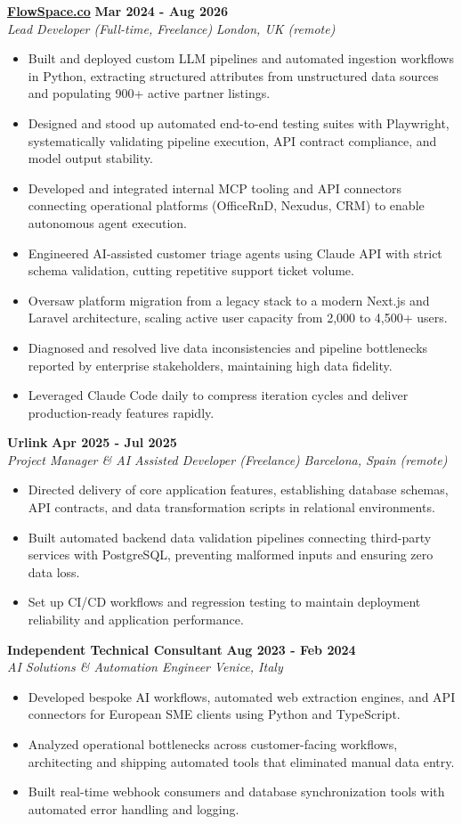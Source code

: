 \documentclass[10pt,a4paper]{article}
\newcommand{\role}[4]{%
  \textbf{#1} \hfill \textbf{#2}\\[1pt]%
  \textit{#3} \hfill \textit{#4}\\[2pt]%
}
\begin{document}
\role{\href{https://flowspace.co}{FlowSpace.co}}{Mar 2024 - Aug 2026}{Lead Developer (Full-time, Freelance)}{London, UK (remote)}
\begin{itemize}
  \item Built and deployed custom LLM pipelines and automated ingestion workflows in Python, extracting structured attributes from unstructured data sources and populating 900+ active partner listings.
  \item Designed and stood up automated end-to-end testing suites with Playwright, systematically validating pipeline execution, API contract compliance, and model output stability.
  \item Developed and integrated internal MCP tooling and API connectors connecting operational platforms (OfficeRnD, Nexudus, CRM) to enable autonomous agent execution.
  \item Engineered AI-assisted customer triage agents using Claude API with strict schema validation, cutting repetitive support ticket volume.
  \item Oversaw platform migration from a legacy stack to a modern Next.js and Laravel architecture, scaling active user capacity from 2,000 to 4,500+ users.
  \item Diagnosed and resolved live data inconsistencies and pipeline bottlenecks reported by enterprise stakeholders, maintaining high data fidelity.
  \item Leveraged Claude Code daily to compress iteration cycles and deliver production-ready features rapidly.
\end{itemize}

\role{Urlink}{Apr 2025 - Jul 2025}{Project Manager \& AI Assisted Developer (Freelance)}{Barcelona, Spain (remote)}
\begin{itemize}
  \item Directed delivery of core application features, establishing database schemas, API contracts, and data transformation scripts in relational environments.
  \item Built automated backend data validation pipelines connecting third-party services with PostgreSQL, preventing malformed inputs and ensuring zero data loss.
  \item Set up CI/CD workflows and regression testing to maintain deployment reliability and application performance.
\end{itemize}

\role{Independent Technical Consultant}{Aug 2023 - Feb 2024}{AI Solutions \& Automation Engineer}{Venice, Italy}
\begin{itemize}
  \item Developed bespoke AI workflows, automated web extraction engines, and API connectors for European SME clients using Python and TypeScript.
  \item Analyzed operational bottlenecks across customer-facing workflows, architecting and shipping automated tools that eliminated manual data entry.
  \item Built real-time webhook consumers and database synchronization tools with automated error handling and logging.
\end{itemize}
\end{document}
